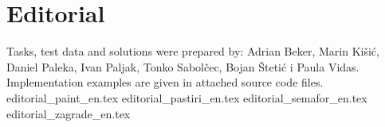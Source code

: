 \documentclass[a4paper]{article}
\date{October 3rd 2020.}
\begin{document}
\section*{Editorial}
Tasks, test data and solutions were prepared by:
Adrian Beker, Marin Kišić,
Daniel Paleka, Ivan Paljak, Tonko Sabolčec, Bojan Štetić i Paula Vidas.
Implementation examples are given in attached source code files.
{editorial_paint_en.tex}
\clearpage
{editorial_pastiri_en.tex}
\clearpage
{editorial_semafor_en.tex}
\clearpage
{editorial_zagrade_en.tex}
\clearpage
\end{document}
